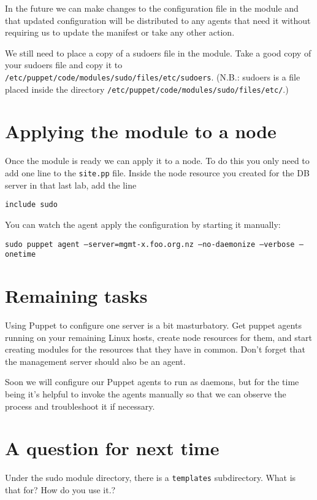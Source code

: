 \documentclass{article}   	%
\begin{document}
In the future we can make changes to the configuration file in the module and that updated configuration will be distributed to any agents that need it without requiring us to update the manifest or take any other action.

We still need to place a copy of a sudoers file in the module.  Take a good copy of your sudoers file and copy it to \texttt{/etc/puppet/code/modules/sudo/files/etc/sudoers}. (N.B.: sudoers is a file placed inside the directory \texttt{/etc/puppet/code/modules/sudo/files/etc/}.)

\section*{Applying the module to a node}
Once the module is ready we can apply it to a node.  To do this you only need to add one line to the \texttt{site.pp} file.  Inside the node resource you created for the DB server in that last lab, add the line

\texttt{include sudo}

You can watch the agent apply the configuration by starting it manually:

\texttt{sudo puppet agent --server=mgmt-x.foo.org.nz --no-daemonize --verbose --onetime}

\section*{Remaining tasks}
Using Puppet to configure one server is a bit masturbatory.  Get puppet agents running on your remaining Linux hosts, create node resources for them, and start creating modules for the resources that they have in common.  Don't forget that the management server should also be an agent.

Soon we will configure our Puppet agents to run as daemons, but for the time being it's helpful to invoke the agents manually so that we can observe the process and troubleshoot it if necessary.

\section*{A question for next time}
Under the sudo module directory, there is a \texttt{templates} subdirectory.  What is that for?  How do you use it.?
\end{document}
